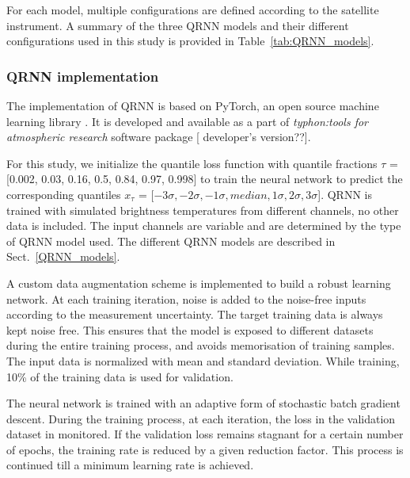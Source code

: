 \documentclass[amt, manuscript]{copernicus}
\newcommand{\todo}[1]{{\color{red} #1}}
\begin{document}
For each model, multiple configurations are defined according to the satellite instrument. A summary of the three QRNN models and their different configurations used in this study is provided in Table~\ref{tab:QRNN_models}.

\subsubsection{QRNN implementation}
\label{sec:qrnn-implementation}

The implementation of QRNN is based on PyTorch, an open source machine learning
library \citep{paszke2017automatic}. It is developed and available as a part of
\textit{typhon:tools for atmospheric research} software package
       [\todo{developer's version??}].

For this study, we initialize the quantile loss function with quantile fractions $\tau$ = [0.002, 0.03, 0.16, 0.5, 0.84, 0.97, 0.998] to train the neural network to predict the corresponding quantiles $x_{\tau}$ = [$-3\sigma, -2\sigma, -1\sigma, median, 1\sigma, 2\sigma, 3\sigma $]. QRNN is trained with simulated brightness temperatures from different channels, no other data is included. The input channels are variable and are determined by the type of QRNN model used. The different QRNN models are described in Sect.~\ref{QRNN_models}. 

A custom data augmentation scheme is implemented to build a robust learning network. At each training iteration, noise is added to the noise-free inputs according to the measurement uncertainty. The target training data is always kept noise free. This ensures that the model is exposed to different datasets during the entire training process, and avoids memorisation of training samples. The input data is normalized with mean and standard deviation. While training, 10\% of the training data is used for validation.
 
The neural network is trained with an adaptive form of stochastic batch gradient descent. During the training process, at each iteration, the loss in the validation dataset in monitored. If the validation loss remains stagnant for a certain number of epochs, the training rate is reduced  by a given reduction factor. This process is continued till a minimum learning rate is achieved.  
\end{document}
